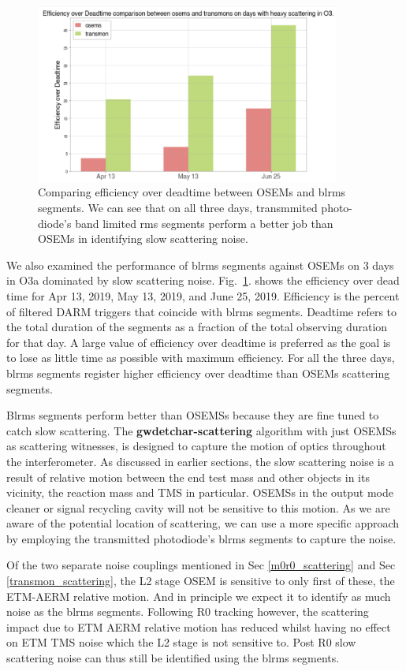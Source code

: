 \documentclass[12pt]{iopart}
\begin{document}
\begin{figure}[h]
    \centering
    \includegraphics[width=10cm]{osemstrans.png}
    \caption{Comparing efficiency over deadtime between OSEMs and blrms segments. We can see that on all three days, transmmited photo-diode's band limited rms segments perform a better job than OSEMs in identifying slow scattering noise.}
    \label{fig:osemtrans}
\end{figure}
\vspace{2cm}
We also examined the performance of blrms segments against OSEMs on 3 days in O3a dominated by slow scattering noise. Fig.~\ref{fig:osemtrans}. shows the efficiency over dead time for Apr 13, 2019, May 13, 2019, and June 25, 2019. Efficiency is the percent of filtered DARM triggers that coincide with blrms segments. Deadtime refers to the total duration of the segments as a fraction of the total observing duration for that day. A large value of efficiency over deadtime is preferred as the goal is to lose as little time as possible with maximum efficiency. For all the three days, blrms segments register higher efficiency over deadtime than OSEMs scattering segments.

Blrms segments perform better than OSEMSs because they are fine tuned to catch slow scattering. The \textbf{gwdetchar-scattering} algorithm with just OSEMSs as scattering witnesses, is designed to capture the motion of optics throughout the interferometer. As discussed in earlier sections, the slow scattering noise is a result of relative motion between the end test mass and other objects in its vicinity, the reaction mass and TMS in particular. OSEMSs in the output mode cleaner or signal recycling cavity will not be sensitive to this motion. As we are aware of the potential location of scattering, we can use a more specific approach by employing the transmitted photodiode’s blrms segments to capture the noise. 


Of the two separate noise couplings mentioned in Sec \ref{m0r0_scattering}  and Sec \ref{transmon_scattering}, the L2 stage OSEM is sensitive to only first of these, the ETM-AERM relative motion. And in principle we expect it to identify as much noise as the blrms segments. Following R0 tracking however, the scattering impact due to ETM AERM relative motion has reduced whilst having no effect on ETM TMS noise which the L2 stage is not sensitive to. Post R0 slow scattering noise can thus still be identified using the blrms segments.
\end{document}
